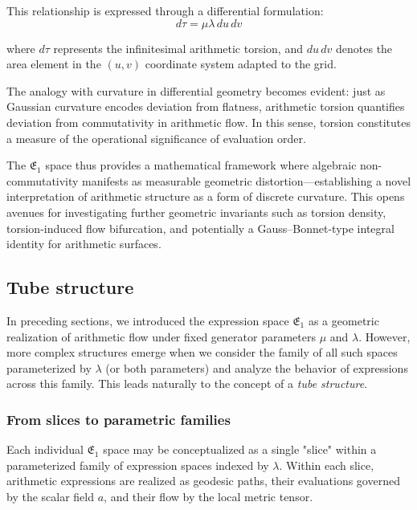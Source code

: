 This relationship is expressed through a differential formulation:
\begin{equation}
d\tau = \mu \lambda\, du\, dv
\end{equation}

where $d\tau$ represents the infinitesimal arithmetic torsion, and $du\, dv$ denotes the area element in the $(u, v)$ coordinate system adapted to the grid.

The analogy with curvature in differential geometry becomes evident: just as Gaussian curvature encodes deviation from flatness, arithmetic torsion quantifies deviation from commutativity in arithmetic flow. In this sense, torsion constitutes a measure of the operational significance of evaluation order.

The $\mathfrak{E}_1$ space thus provides a mathematical framework where algebraic non-commutativity manifests as measurable geometric distortion—establishing a novel interpretation of arithmetic structure as a form of discrete curvature. This opens avenues for investigating further geometric invariants such as torsion density, torsion-induced flow bifurcation, and potentially a Gauss–Bonnet-type integral identity for arithmetic surfaces.


\subsection{Tube structure}\label{sec:tubestructure}

In preceding sections, we introduced the expression space $\mathfrak{E}_1$ as a geometric realization of arithmetic flow under fixed generator parameters $\mu$ and $\lambda$. However, more complex structures emerge when we consider the family of all such spaces parameterized by $\lambda$ (or both parameters) and analyze the behavior of expressions across this family. This leads naturally to the concept of a \emph{tube structure}.

\subsubsection{From slices to parametric families}

Each individual $\mathfrak{E}_1$ space may be conceptualized as a single "slice" within a parameterized family of expression spaces indexed by $\lambda$. Within each slice, arithmetic expressions are realized as geodesic paths, their evaluations governed by the scalar field $a$, and their flow by the local metric tensor.

